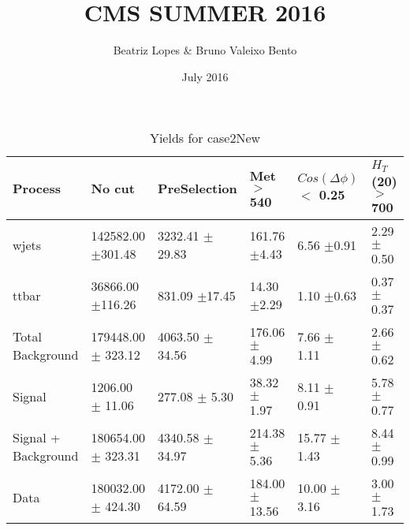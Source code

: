 \documentclass{article}
\title{CMS SUMMER 2016}
\author{Beatriz Lopes &  Bruno Valeixo Bento}
\date{July 2016}
\begin{document}
\maketitle
\begin{table}[!h]
\begin{tabular}{llllll}
\hline
Process & No cut& PreSelection& Met $>$ 540& $Cos(\Delta \phi)$ $<$ 0.25& $H_T$ (20) $>$ 700\\
\hline
wjets & 142582.00 $\pm$301.48 & 3232.41 $\pm$29.83 & 161.76 $\pm$4.43 & 6.56 $\pm$0.91 & 2.29 $\pm$0.50 \\
ttbar & 36866.00 $\pm$116.26 & 831.09 $\pm$17.45 & 14.30 $\pm$2.29 & 1.10 $\pm$0.63 & 0.37 $\pm$0.37 \\
Total Background & 179448.00 $\pm$ 323.12 & 4063.50 $\pm$ 34.56 & 176.06 $\pm$ 4.99 & 7.66 $\pm$ 1.11 & 2.66 $\pm$ 0.62 \\
\hline
Signal & 1206.00 $\pm$ 11.06 & 277.08 $\pm$ 5.30 & 38.32 $\pm$ 1.97 & 8.11 $\pm$ 0.91 & 5.78 $\pm$ 0.77 \\
\hline
Signal + Background & 180654.00 $\pm$ 323.31 & 4340.58 $\pm$ 34.97 & 214.38 $\pm$ 5.36 & 15.77 $\pm$ 1.43 & 8.44 $\pm$ 0.99 \\
\hline
\hline
Data & 180032.00 $\pm$ 424.30 & 4172.00 $\pm$ 64.59 & 184.00 $\pm$ 13.56 & 10.00 $\pm$ 3.16 & 3.00 $\pm$ 1.73 \\
\hline
\end{tabular}
\caption{Yields for case2New}
\end{table}
\end{document}
